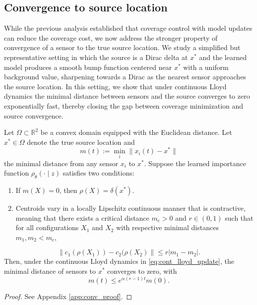 \documentclass[onefignum,onetabnum]{siamart171218} %
\begin{document}
\subsection{Convergence to source location}
\label{sec:methods_source_conv}
While the previous analysis established that coverage control with model updates can reduce the coverage cost, we now address the stronger property of convergence of a sensor to the true source location. 
We study a simplified but representative setting in which the source is a Dirac delta at $x^*$ and the learned model produces a smooth bump function centered near $x^*$ with a uniform background value, sharpening towards a Dirac as the nearest sensor approaches the source location. 
In this setting, we show that under continuous Lloyd dynamics the minimal distance between sensors and the source converges to zero exponentially fast, thereby closing the gap between coverage minimization and source convergence.  


\begin{theorem} \label{thm:conv}
Let $\Omega \subset \mathbb R^2$ be a convex domain equipped with the Euclidean distance.  Let $x^* \in \Omega$ denote the true source location and 
\[
    m(t) := \min_{i} \|x_i(t) - x^*\|
\]
the minimal distance from any sensor $x_i$ to $x^*$. 
Suppose the learned importance function $\rho_\theta(\cdot \mid z)$ satisfies two conditions: 
\begin{enumerate}
    \item If $m(X) = 0$, then $\rho(X) = \delta(x^*)$.
    \item Centroids vary in a locally Lipschitz continuous manner that is contractive, meaning that there exists a critical distance $m_\mathrm{c}>0$ and $r \in (0,1)$ such that for all configurations $X_1$ and $X_2$ with respective minimal distances $m_1, m_2 < m_\mathrm{c}$, 
\end{enumerate}
\begin{equation}
        \|c_1(\rho(X_1))  - c_2(\rho(X_2)\| \le r|m_1 - m_2|. \label{lipbound}
    \end{equation}
    Then, under the continuous Lloyd dynamics in \eqref{eq:cont_lloyd_update},
    the minimal distance of sensors to $x^*$ converges to zero, with
    \[
        m(t) \le e^{\alpha(r-1)t} m(0).
    \]
\end{theorem}

\begin{proof}
    See Appendix \ref{app:conv_proof}.
\end{proof}
\end{document}

